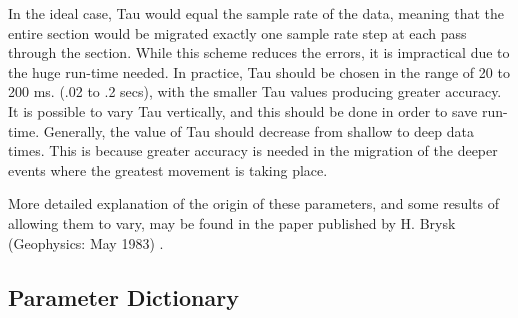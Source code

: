 In the ideal case, Tau would equal the sample rate of the data, meaning
that the entire section would be migrated exactly one sample rate step
at each pass through the section. While this scheme  reduces the errors,
it is impractical due to the huge run-time  needed. In practice, Tau
should be chosen in the range of 20 to 200 ms. (.02 to .2 secs), with
the smaller Tau values producing greater accuracy.  It is possible to
vary Tau vertically, and this should be done in order to save run-time.
Generally, the value of Tau should decrease from shallow to deep data
times. This is because greater accuracy is needed in the migration of
the deeper events where the greatest movement is taking place.

More detailed explanation of the origin of these parameters, and some
results of allowing them to vary, may be found in the paper published by
H. Brysk (Geophysics: May 1983) \cite{Brysk1983}.

\subsection{Parameter Dictionary}

